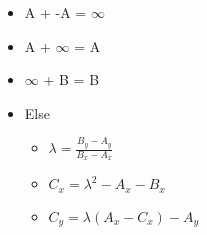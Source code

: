 \begin{itemize}
    \item[] A + -A = $\infty$
    \item[] A + $\infty$ = A
    \item[] $\infty$ + B = B
    \item[] Else
    \begin{itemize}
        \item[] $\lambda = \frac{B_y - A_y} {B_x - A_x}$
        \item[] $C_x = \lambda^2 - A_x - B_x$
        \item[] $C_y = \lambda(A_x - C_x) - A_y$
    \end{itemize}
\end{itemize}

